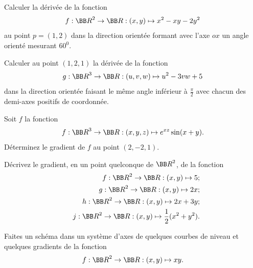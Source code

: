 \documentclass[12pt,french,oneside,a4paper]{memoir} %
\begin{document}
\begin{exo}
Calculer la dérivée de la fonction
\begin{equation*}
f : {\BB R}^2 \rightarrow {\BB R} : (x,y) \mapsto x^2-xy-2y^2
\end{equation*}
au point $p=(1,2)$ dans la direction orientée formant avec l'axe $ox$ un  angle orienté mesurant $60^0$.
\end{exo}
\begin{exo}
Calculer au point $(1,2,1)$ la dérivée de la fonction
\begin{equation*}
g : {\BB R}^3 \rightarrow {\BB R} : (u,v,w) \mapsto u^2-3vw+5
\end{equation*}
dans la direction orientée faisant le même angle inférieur à 
$\displaystyle{\frac{\pi}{2}}$ avec chacun des demi-axes positifs de coordonnée.
\end{exo}
\begin{exo}
Soit $f$ la fonction
\begin{equation*}
f: {\BB R}^3\rightarrow\BB R :
(x,y,z)\mapsto e^{xz}\sin(x+y).
\end{equation*}
Déterminez le gradient de $f$ au point $(2,-2,1)$.
\end{exo}

\begin{exo}
Décrivez le gradient, en un point quelconque de ${\BB R}^2$,
de la fonction
\begin{eqnarray*}
&&f: {\BB R}^2\rightarrow\BB R :
(x,y)\mapsto 5;\\
&&g: {\BB R}^2\rightarrow\BB R :
(x,y)\mapsto 2x;\\
&&h: {\BB R}^2\rightarrow\BB R :
(x,y)\mapsto 2x+3y;\\
&&j: {\BB R}^2\rightarrow\BB R :
(x,y)\mapsto \frac{1}{2}(x^2+y^2).
\end{eqnarray*}
\end{exo}

\begin{exo}
Faites un schéma dans un système d'axes de quelques
courbes de niveau et quelques gradients de la fonction
\begin{equation*}
f: {\BB R}^2\rightarrow\BB R :
(x,y)\mapsto xy.
\end{equation*}
\end{exo}
\end{document}
